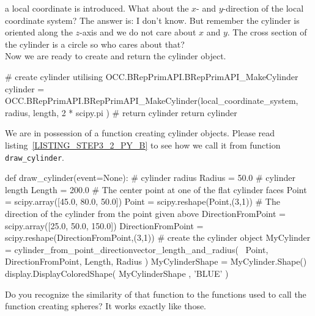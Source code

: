 a local coordinate is introduced.
What about the $x$- and $y$-direction of the local coordinate system?
The answer is: I don't know.
But remember the cylinder is oriented along the $z$-axis and we do not care about $x$ and $y$.
The cross section of the cylinder is a circle so who cares about that?
\\
Now we are ready to create and return the cylinder object.
\begin{python}
    # create cylinder utilising OCC.BRepPrimAPI.BRepPrimAPI_MakeCylinder
    cylinder = OCC.BRepPrimAPI.BRepPrimAPI_MakeCylinder(local_coordinate_system, 
                                                        radius, 
                                                        length, 
                                                        2 * scipy.pi )
    # return cylinder
    return cylinder
\end{python}

We are in possession of a function creating cylinder objects.
Please read listing~\ref{LISTING_STEP3_2_PY_B} to see how we call it from function {\tt draw\_cylinder}.
\begin{python}[moreemph={[4], 46, 48},caption={Step3\_2.py - Calling the function defining a cylinder from a point, a direction vector, the length and the radius},label=LISTING_STEP3_2_PY_B]
def draw_cylinder(event=None):
    # cylinder radius
    Radius = 50.0
    # cylinder length
    Length = 200.0
    # The center point at one of the flat cylinder faces 
    Point = scipy.array([45.0, 80.0, 50.0])
    Point = scipy.reshape(Point,(3,1))
    # The direction of the cylinder from the point given above 
    DirectionFromPoint = scipy.array([25.0, 50.0, 150.0])
    DirectionFromPoint = scipy.reshape(DirectionFromPoint,(3,1))
    # create the cylinder object
    MyCylinder = cylinder_from_point_directionvector_length_and_radius( \
                                                       Point, 
                                                       DirectionFromPoint,
                                                       Length,
                                                       Radius )
    MyCylinderShape = MyCylinder.Shape()
    display.DisplayColoredShape( MyCylinderShape , 'BLUE' ) 
\end{python}
Do you recognize the similarity of that function to the functions used to call the function creating spheres?
It works exactly like those.

